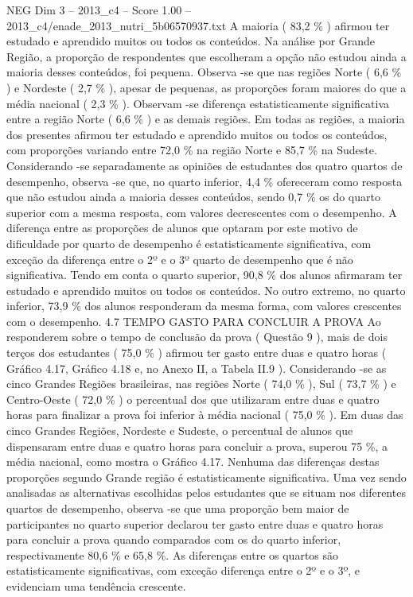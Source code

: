 \begin{textsample}{NEG Dim 3 – 2013\_c4 – Score 1.00 – 2013\_c4/enade\_2013\_nutri\_5b06570937.txt}
A maioria ( 83,2 \% ) afirmou ter estudado e aprendido muitos ou todos os conteúdos.
Na análise por Grande Região, a proporção de respondentes que escolheram a opção não estudou ainda a maioria desses conteúdos, foi pequena.
Observa -se que nas regiões Norte ( 6,6 \% ) e Nordeste ( 2,7 \% ), apesar de pequenas, as proporções foram maiores do que a média nacional ( 2,3 \% ).
Observam -se diferença estatisticamente significativa entre a região Norte ( 6,6 \% ) e as demais regiões.
Em todas as regiões, a maioria dos presentes afirmou ter estudado e aprendido muitos ou todos os conteúdos, com proporções variando entre 72,0 \% na região Norte e 85,7 \% na Sudeste.
Considerando -se separadamente as opiniões de estudantes dos quatro quartos de desempenho, observa -se que, no quarto inferior, 4,4 \% ofereceram como resposta que não estudou ainda a maioria desses conteúdos, sendo 0,7 \% os do quarto superior com a mesma resposta, com valores decrescentes com o desempenho.
A diferença entre as proporções de alunos que optaram por este motivo de dificuldade por quarto de desempenho é estatisticamente significativa, com exceção da diferença entre o 2º e o 3º quarto de desempenho que é não significativa.
Tendo em conta o quarto superior, 90,8 \% dos alunos afirmaram ter estudado e aprendido muitos ou todos os conteúdos.
No outro extremo, no quarto inferior, 73,9 \% dos alunos responderam da mesma forma, com valores crescentes com o desempenho. 4.7 TEMPO GASTO PARA CONCLUIR A PROVA Ao responderem sobre o tempo de conclusão da prova ( Questão 9 ), mais de dois terços dos estudantes ( 75,0 \% ) afirmou ter gasto entre duas e quatro horas ( Gráfico 4.17, Gráfico 4.18 e, no Anexo II, a Tabela II.9 ).
Considerando -se as cinco Grandes Regiões brasileiras, nas regiões Norte ( 74,0 \% ), Sul ( 73,7 \% ) e Centro-Oeste ( 72,0 \% ) o percentual dos que utilizaram entre duas e quatro horas para finalizar a prova foi inferior à média nacional ( 75,0 \% ).
Em duas das cinco Grandes Regiões, Nordeste e Sudeste, o percentual de alunos que dispensaram entre duas e quatro horas para concluir a prova, superou 75 \%, a média nacional, como mostra o Gráfico 4.17.
Nenhuma das diferenças destas proporções segundo Grande região é estatisticamente significativa.
Uma vez sendo analisadas as alternativas escolhidas pelos estudantes que se situam nos diferentes quartos de desempenho, observa -se que uma proporção bem maior de participantes no quarto superior declarou ter gasto entre duas e quatro horas para concluir a prova quando comparados com os do quarto inferior, respectivamente 80,6 \% e 65,8 \%.
As diferenças entre os quartos são estatisticamente significativas, com exceção diferença entre o 2º e o 3º, e evidenciam uma tendência crescente.

\end{textsample}
